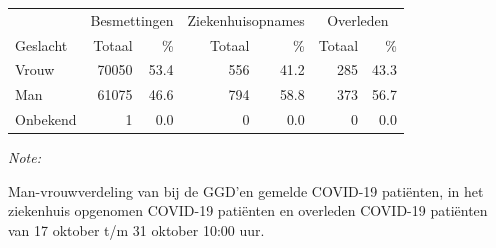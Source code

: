 \documentclass[
  english,
  man,floatsintext]{apa6}
\begin{document}
\begin{table}[H]
\centering\begingroup\fontsize{11}{13}\selectfont

\begin{threeparttable}
\begin{tabular}{lrrrrrr}
\toprule
\multicolumn{1}{c}{ } & \multicolumn{2}{c}{Besmettingen} & \multicolumn{2}{c}{Ziekenhuisopnames} & \multicolumn{2}{c}{Overleden} \\
\cmidrule(l{3pt}r{3pt}){2-3} \cmidrule(l{3pt}r{3pt}){4-5} \cmidrule(l{3pt}r{3pt}){6-7}
Geslacht & Totaal & \% & Totaal & \% & Totaal & \%\\
\midrule
Vrouw & 70050 & 53.4 & 556 & 41.2 & 285 & 43.3\\
Man & 61075 & 46.6 & 794 & 58.8 & 373 & 56.7\\
Onbekend & 1 & 0.0 & 0 & 0.0 & 0 & 0.0\\
\bottomrule
\end{tabular}
\begin{tablenotes}
\item \textit{Note: } 
\item Man-vrouwverdeling van bij de GGD’en gemelde COVID-19 patiënten, in het ziekenhuis opgenomen COVID-19 patiënten en overleden COVID-19 patiënten van 17 oktober t/m 31 oktober 10:00 uur.
\end{tablenotes}
\end{threeparttable}
\endgroup{}
\end{table}
\newpage
\end{document}
